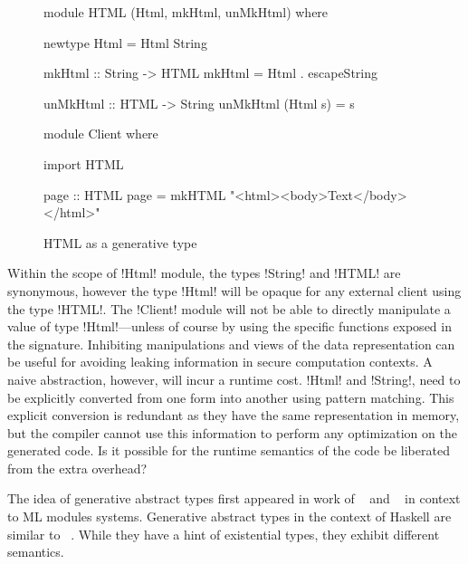 \documentclass[screen,nonacm,manuscript,review]{acmart} %
\begin{document}
\begin{figure}[ht]
\centering
\begin{minipage}[ht]{0.5\linewidth}
\begin{CenteredBox}
\begin{code}
module HTML (Html, mkHtml, unMkHtml)
where

newtype Html = Html String

mkHtml :: String -> HTML
mkHtml = Html . escapeString

unMkHtml :: HTML -> String
unMkHtml (Html s) = s
\end{code}
\end{CenteredBox}
\end{minipage}%
\begin{minipage}[ht]{0.5\linewidth}
\begin{CenteredBox}
\begin{code}
module Client
where

import HTML

page :: HTML
page = mkHTML "<html><body>Text</body></html>"





\end{code}
\end{CenteredBox}
\end{minipage}
\caption{HTML as a generative type}
\label{fig:html-generative-type}
\end{figure}

Within the scope of !Html! module, the types !String! and !HTML! are
synonymous, however the type !Html! will be opaque for any
external client using the type !HTML!. The !Client! module will not be
able to directly manipulate a value of type !Html!---unless
of course by using the specific functions exposed in the
signature. Inhibiting manipulations and views of the data
representation can be useful for avoiding leaking information in
secure computation contexts. A naive abstraction, however,
will incur a runtime cost. !Html! and !String!, need to be explicitly
converted from one form into another using pattern matching.
This explicit conversion is redundant as they have the same
representation in memory, but the compiler cannot use this
information to perform any optimization on the generated code.
Is it possible for the runtime semantics of the code be liberated from
the extra overhead?

The idea of generative abstract types first appeared in work of
~\citet{leroy_applicative_1995} and ~\citet{milner_definition_1997}
in context to ML modules systems. Generative abstract types in the
context of Haskell are similar to ~\cite{montagu_modeling_2009}.
While they have a hint of existential types, they exhibit different
semantics.
\end{document}
